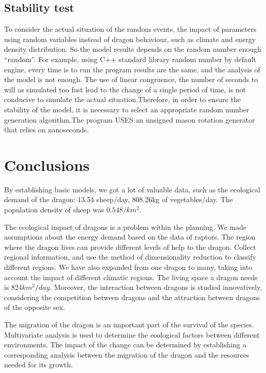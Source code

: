 \subsection{Stability test}
To consider the actual situation of the random events, the impact of parameters using random variables instead of dragon behaviour, such as climate and energy density distribution. So the model results depends on the random number enough ``random''. For example, using C++ standard library random number by default engine, every time is to run the program results are the same, and the analysis of the model is not enough. The use of linear congruence, the number of seconds to will as simulated too fast lead to the change of a single period of time, is not conducive to simulate the actual situation.Therefore, in order to ensure the stability of the model, it is necessary to select an appropriate random number generation algorithm.The program USES an unsigned mason rotation generator that relies on nanoseconds.


\section{Conclusions}

By establishing basic models, we got a lot of valuable data, such as the ecological demand of the dragon: 13.54 sheep/day, 808.26kg of vegetables/day. The population density of sheep was $0.548 /km^2$.

The ecological impact of dragons is a problem within the planning. We made assumptions about the energy demand based on the data of raptors. The region where the dragon lives can provide different levels of help to the dragon. Collect regional information, and use the method of dimensionality reduction to classify different regions. We have also expanded from one dragon to many, taking into account the impact of different climatic regions. The living space a dragon needs is 824$km^2/day$. Moreover, the interaction between dragons is studied innovatively, considering the competition between dragons and the attraction between dragons of the opposite sex.

The migration of the dragon is an important part of the survival of the species. Multivariate analysis is used to determine the ecological factors between different environments. The impact of the change can be determined by establishing a corresponding analysis between the migration of the dragon and the resources needed for its growth.

